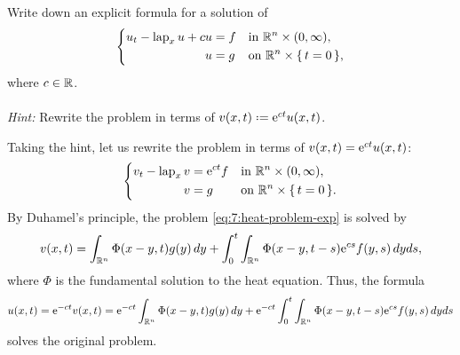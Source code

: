 \begin{problem}
  Write down an explicit formula for a solution of
  \[
    \left\{
      \begin{aligned}
        u_t-\operatorname{lap}_x u+cu&=f&&\text{in \(\mathbb{R}^n\times(0,\infty)\),}\\
        u&=g&&\text{on \(\mathbb{R}^n\times\{\,t=0\,\}\),}
      \end{aligned}
    \right.
  \]
  where \(c\in\mathbb{R}\).
  \\\\
  \emph{Hint:} Rewrite the problem in terms of
  \(v(x,t)\defeq\rme^{ct}u(x,t)\).
\end{problem}
\begin{solution*}
  Taking the hint, let us rewrite the problem in terms of
  \(v(x,t)=\mathrm{e}^{ct}u(x,t)\):
  \begin{equation}
    \label{eq:7:heat-problem-exp}
    \left\{
      \begin{aligned}
        v_t-\operatorname{lap}_xv&=\mathrm{e}^{ct}f&&\text{in
          \(\mathbb{R}^n\times(0,\infty),\)}\\
        v&=g&&\text{on \(\mathbb{R}^n\times\{\,t=0\,\}\).}
      \end{aligned}
    \right.
  \end{equation}
  By Duhamel's principle, the problem \eqref{eq:7:heat-problem-exp} is
  solved by
  \[
    v(x,t)=\int_{\mathbb{R}^n}\Phi(x-y,t)g(y)\mathop{}\!d y
    +\int_0^t\int_{\mathbb{R}^n}\Phi(x-y,t-s)\mathrm{e}^{cs}f(y,s)\mathop{}\!d yds,
  \]
  where \(\Phi\) is the fundamental solution to the heat equation. Thus,
  the formula
  \[
    u(x,t)=\mathrm{e}^{-ct}v(x,t)=\mathrm{e}^{-ct}\int_{\mathbb{R}^n}\Phi(x-y,t)g(y)\mathop{}\!d y
    +\mathrm{e}^{-ct}\int_0^t\int_{\mathbb{R}^n}\Phi(x-y,t-s)\mathrm{e}^{cs}f(y,s)\mathop{}\!d yds
  \]
  solves the original problem.
\end{solution*}

